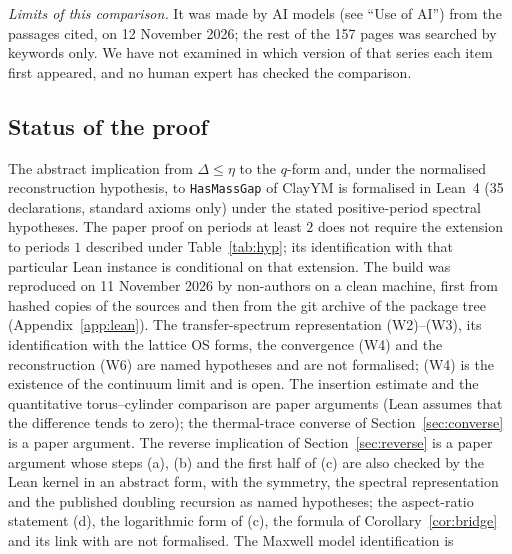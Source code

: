 \documentclass[11pt,a4paper]{article}
\theoremstyle{plain}
\theoremstyle{definition}
\theoremstyle{remark}
\numberwithin{equation}{section}
\begin{document}
\emph{Limits of this comparison.} It was made by AI models (see ``Use of AI'') from the passages cited, on 12 November 2026; the rest
of the 157 pages was searched by keywords only. We have not examined in which version of that series each item first appeared, and no human
expert has checked the comparison.

\subsection{Status of the proof}\label{sec:status}
The abstract implication from $\Delta\le\eta$ to the $q$-form and, under the normalised reconstruction hypothesis, to \texttt{HasMassGap}
of ClayYM is formalised in Lean~4 (35 declarations, standard axioms only) under the stated positive-period spectral hypotheses. The paper proof on periods at least $2$ does not require the extension to periods $1$ described under Table~\ref{tab:hyp}; its identification with that particular Lean instance is conditional on that extension. The build was reproduced on 11 November 2026 by non-authors on a
clean machine, first from hashed copies of the sources and then from the git archive of the package tree (Appendix~\ref{app:lean}). The transfer-spectrum representation
(W2)--(W3), its identification with the lattice OS forms, the convergence (W4) and the reconstruction (W6) are named hypotheses and are not
formalised; (W4) is the existence of the continuum limit and is open. The insertion estimate and the quantitative torus--cylinder comparison
are paper arguments (Lean assumes that the difference tends to zero); the thermal-trace converse of Section~\ref{sec:converse} is a paper argument. The reverse implication of Section~\ref{sec:reverse} is a paper argument whose steps (a), (b) and the first half of (c) are also checked by the Lean kernel in an abstract form, with the symmetry, the spectral representation and the published doubling recursion as named hypotheses; the aspect-ratio statement (d), the logarithmic form of (c), the formula of Corollary~\ref{cor:bridge} and its link with \cite{BB26v5} are not formalised. The Maxwell model identification is
\end{document}
